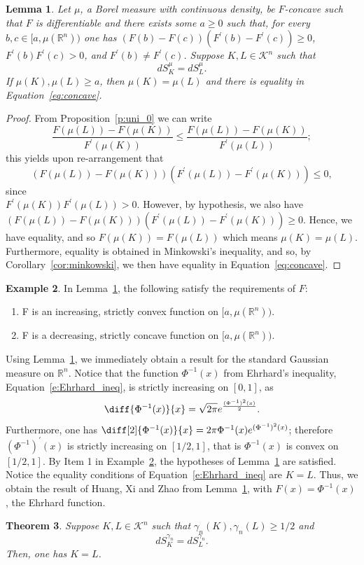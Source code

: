 \documentclass[11pt]{amsart}
\newtheorem{theorem}{Theorem}[section]
\newtheorem{lemma}[theorem]{Lemma}
\theoremstyle{definition}
\newtheorem{example}[theorem]{Example}
\theoremstyle{remark}
\numberwithin{equation}{section}
\newcommand{\R}{\mathbb{R}}
\newcommand{\conbod}{\mathcal{K}^n}
\begin{document}
\begin{lemma}
\label{l:uni}
Let $\mu$, a Borel measure with continuous density, be $F$-concave such that $F$ is differentiable and there exists some $a\geq 0$ such that, for every $b,c\in [a,\mu(\R^n))$ one has $(F(b)-F(c))(F^\prime(b)-F^\prime(c))\geq 0$, $F^\prime(b)F^\prime(c)>0$, and $F^\prime(b)\neq F^\prime(c)$. Suppose $K,L\in\conbod$ such that $$dS^{\mu}_{K}=dS^{\mu}_{L}.$$ If $\mu(K),\mu(L)\geq a$, then $\mu(K)=\mu(L)$ and there is equality in Equation~\ref{eq:concave}.
\end{lemma}
\begin{proof}
From Proposition~\ref{p:uni_0} we can write
$$\frac{F(\mu(L))-F(\mu(K))}{F^{\prime}(\mu(K))}\leq \frac{F(\mu(L))-F(\mu(K))}{F^{\prime}(\mu(L))};$$
this yields upon re-arrangement that $$\left(F(\mu(L))-F(\mu(K))\right)\left(F^\prime(\mu(L))-F^\prime(\mu(K))\right) \leq 0,$$ since \\ $F^\prime(\mu(K))F^\prime(\mu(L))>0.$ However, by hypothesis, we also have\\ $\left(F(\mu(L))-F(\mu(K))\right)\left(F^\prime(\mu(L))-F^\prime(\mu(K))\right) \geq 0.$ Hence, we have equality, and so $F(\mu(K))=F(\mu(L))$ which means $\mu(K)=\mu(L)$. Furthermore, equality is obtained in Minkowski's inequality, and so, by Corollary~\ref{cor:minkowski}, we then have equality in Equation~\ref{eq:concave}.
\end{proof}
\begin{example}
\label{ex:minkowski}
In Lemma~\ref{l:uni}, the following satisfy the requirements of $F$:
\begin{enumerate}
    \item F is an increasing, strictly convex function on $[a,\mu(\R^n)).$
    \item F is a decreasing, strictly concave function on $[a,\mu(\R^n)).$
\end{enumerate}
\end{example}

Using Lemma~\ref{l:uni}, we immediately obtain a result for the standard Gaussian measure on $\R^n$. Notice that the function $\Phi^{-1}(x)$ from Ehrhard's inequality, Equation~\ref{e:Ehrhard_ineq}, is strictly increasing on $[0,1]$, as $$\diff{\Phi^{-1}(x)}{x}=\sqrt{2\pi}e^{\frac{(\Phi^{-1})^2(x)}{2}}.$$ Furthermore, one has $\diff[2]{\Phi^{-1}(x)}{x}=2\pi\Phi^{-1}(x)e^{(\Phi^{-1})^2(x)}$; therefore $(\Phi^{-1})^\prime(x)$ is strictly increasing on $[1/2,1]$, that is $\Phi^{-1}(x)$ is convex on $[1/2,1]$. By Item 1 in Example~\ref{ex:minkowski}, the hypotheses of Lemma~\ref{l:uni} are satisfied. Notice the equality conditions of Equation~\ref{e:Ehrhard_ineq} are $K=L$. Thus, we obtain the result of Huang, Xi and Zhao \cite{HXZ21} from Lemma~\ref{l:uni}, with $F(x)=\Phi^{-1}(x)$, the Ehrhard function.
\begin{theorem}
\label{t:ehr}
Suppose $K,L\in\conbod$ such that $\gamma_n(K),\gamma_n(L)\geq 1/2$ and $$dS^{\gamma_n}_{K}=dS^{\gamma_n}_{L}.$$ Then, one has $K=L$.
\end{theorem}
\end{document}
